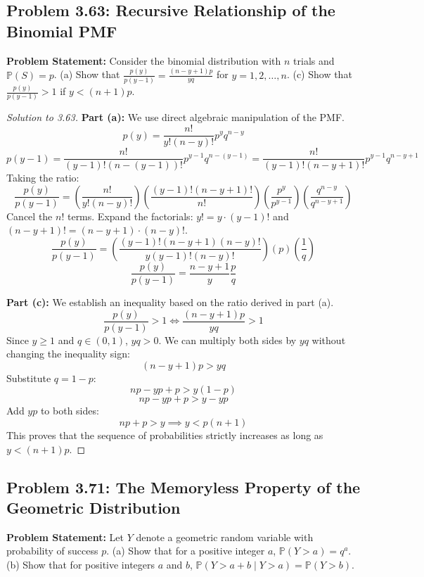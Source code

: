 \documentclass[11pt, letterpaper]{article}
\theoremstyle{definition}
\theoremstyle{remark}
\newcommand{\Prob}{\mathbb{P}}
\begin{document}
\subsection{Problem 3.63: Recursive Relationship of the Binomial PMF}
\textbf{Problem Statement:} Consider the binomial distribution with $n$ trials and $\Prob(S) = p$.
(a) Show that $\frac{p(y)}{p(y-1)} = \frac{(n-y+1)p}{yq}$ for $y = 1, 2, \dots, n$.
(c) Show that $\frac{p(y)}{p(y-1)} > 1$ if $y < (n+1)p$.

\begin{proof}[Solution to 3.63]
\textbf{Part (a):} We use direct algebraic manipulation of the PMF.
\[ p(y) = \frac{n!}{y!(n-y)!} p^y q^{n-y} \]
\[ p(y-1) = \frac{n!}{(y-1)!(n-(y-1))!} p^{y-1} q^{n-(y-1)} = \frac{n!}{(y-1)!(n-y+1)!} p^{y-1} q^{n-y+1} \]
Taking the ratio:
\[ \frac{p(y)}{p(y-1)} = \left( \frac{n!}{y!(n-y)!} \right) \left( \frac{(y-1)!(n-y+1)!}{n!} \right) \left( \frac{p^y}{p^{y-1}} \right) \left( \frac{q^{n-y}}{q^{n-y+1}} \right) \]
Cancel the $n!$ terms. Expand the factorials: $y! = y \cdot (y-1)!$ and $(n-y+1)! = (n-y+1) \cdot (n-y)!$.
\[ \frac{p(y)}{p(y-1)} = \left( \frac{(y-1)!(n-y+1)(n-y)!}{y(y-1)!(n-y)!} \right) (p) \left( \frac{1}{q} \right) \]
\[ \frac{p(y)}{p(y-1)} = \frac{n-y+1}{y} \frac{p}{q} \]

\textbf{Part (c):} We establish an inequality based on the ratio derived in part (a).
\[ \frac{p(y)}{p(y-1)} > 1 \iff \frac{(n-y+1)p}{yq} > 1 \]
Since $y \ge 1$ and $q \in (0,1)$, $yq > 0$. We can multiply both sides by $yq$ without changing the inequality sign:
\[ (n-y+1)p > yq \]
Substitute $q = 1-p$:
\[ np - yp + p > y(1-p) \]
\[ np - yp + p > y - yp \]
Add $yp$ to both sides:
\[ np + p > y \implies y < p(n+1) \]
This proves that the sequence of probabilities strictly increases as long as $y < (n+1)p$.
\end{proof}

\subsection{Problem 3.71: The Memoryless Property of the Geometric Distribution}
\textbf{Problem Statement:} Let $Y$ denote a geometric random variable with probability of success $p$.
(a) Show that for a positive integer $a$, $\Prob(Y > a) = q^a$.
(b) Show that for positive integers $a$ and $b$, $\Prob(Y > a+b \mid Y > a) = \Prob(Y > b)$.
\end{document}

